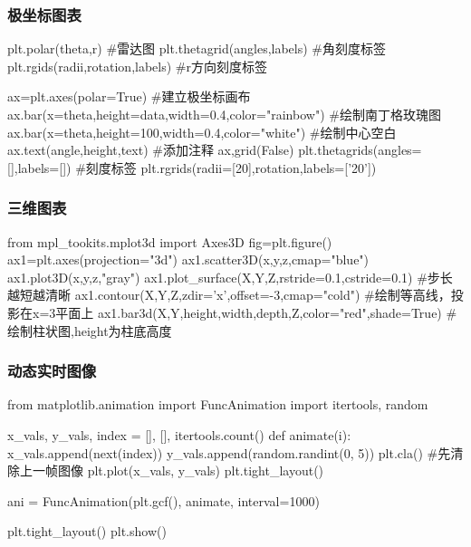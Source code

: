     \subsubsection{极坐标图表}
      \begin{codeblock}[language=python, caption={polar plots of plt}]
        plt.polar(theta,r) #雷达图
        plt.thetagrid(angles,labels) #角刻度标签
        plt.rgids(radii,rotation,labels) #r方向刻度标签

        ax=plt.axes(polar=True) #建立极坐标画布
        ax.bar(x=theta,height=data,width=0.4,color="rainbow") #绘制南丁格玫瑰图
        ax.bar(x=theta,height=100,width=0.4,color="white") #绘制中心空白
        ax.text(angle,height,text) #添加注释
        ax,grid(False)
        plt.thetagrids(angles=[],labels=[]) #刻度标签
        plt.rgrids(radii=[20],rotation,labels=['20'])
      \end{codeblock}

    \subsubsection{三维图表}
      \begin{codeblock}[language=python, caption={3D plots of plt}]
        from mpl_tookits.mplot3d import Axes3D
        fig=plt.figure()
        ax1=plt.axes(projection="3d")
        ax1.scatter3D(x,y,z,cmap="blue")
        ax1.plot3D(x,y,z,"gray")
        ax1.plot_surface(X,Y,Z,rstride=0.1,cstride=0.1) #步长越短越清晰
        ax1.contour(X,Y,Z,zdir='x',offset=-3,cmap="cold") #绘制等高线，投影在x=3平面上
        ax1.bar3d(X,Y,height,width,depth,Z,color="red",shade=True) #绘制柱状图,height为柱底高度
      \end{codeblock}

    \subsubsection{动态实时图像}
      \begin{codeblock}[language=python, caption={plotting live date}]
        from matplotlib.animation import FuncAnimation
        import itertools, random

        x_vals, y_vals, index = [], [], itertools.count()
        def animate(i):
            x_vals.append(next(index))
            y_vals.append(random.randint(0, 5))
            plt.cla() #先清除上一帧图像
            plt.plot(x_vals, y_vals)
            plt.tight_layout()

        ani = FuncAnimation(plt.gcf(), animate, interval=1000)

        plt.tight_layout()
        plt.show()
      \end{codeblock}

